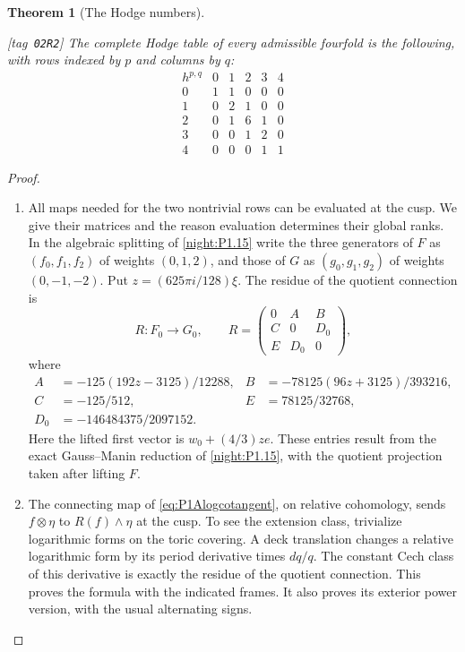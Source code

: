 \documentclass[11pt,a4paper]{article}
\numberwithin{equation}{section}
\newtheorem{theorem}{Theorem}[section]
\theoremstyle{definition}
\newcommand{\C}{\mathbb C}\newcommand{\R}{\mathbb R}\newcommand{\Z}{\mathbb Z}\newcommand{\Q}{\mathbb Q}\newcommand{\N}{\mathbb N}\newcommand{\F}{\mathbb F}
\newcommand{\StatementRecord}[4]{{\upshape\footnotesize[tag~\texttt{#3}]}\enspace\ignorespaces}
\begin{document}
\begin{theorem}[The Hodge numbers]\hypertarget{tag-02R2}{}\label{night:P1A.2}
\StatementRecord{night:P1A.2}{proved}{02R2}{\cref{night:P1.15,night:P1A.1,night:P1.18}}
The complete Hodge table of every admissible fourfold is the
following, with rows indexed by $p$ and columns by $q$:
\[
\begin{array}{c|ccccc}
h^{p,q}&0&1&2&3&4\\\hline
0&1&1&0&0&0\\
1&0&2&1&0&0\\
2&0&1&6&1&0\\
3&0&0&1&2&0\\
4&0&0&0&1&1
\end{array}
\]
\end{theorem}
\begin{proof}
\begin{enumerate}[label=\arabic*.]
\item All maps needed for the two nontrivial rows can be evaluated at
the cusp. We give their matrices and the reason evaluation
determines their global ranks. In the algebraic splitting of
\cref{night:P1.15} write the three generators of $F$ as $(f_0,f_1,f_2)$ of
weights $(0,1,2)$, and those of $G$ as $(g_0,g_1,g_2)$ of
weights $(0,-1,-2)$. Put $z=(625\pi i/128)\xi$.
The residue of the quotient connection is
\[
R:F_0\longrightarrow G_0,\qquad
R=\begin{pmatrix}0&A&B\\C&0&D_0\\E&D_0&0\end{pmatrix},
\]
where
\begin{align*}
A&=-125(192z-3125)/12288,&
B&=-78125(96z+3125)/393216,\\
C&=-125/512,&E&=78125/32768,\\
D_0&=-146484375/2097152.
\end{align*}
Here the lifted first vector is $w_0+(4/3)ze$.
These entries result from the exact Gauss--Manin reduction of
\cref{night:P1.15}, with the quotient projection taken after lifting $F$.

\item The connecting map of \eqref{eq:P1Alogcotangent}, on relative
cohomology, sends $f\otimes\eta$ to $R(f)\wedge\eta$ at the
cusp. To see the extension class, trivialize logarithmic
forms on the toric covering. A deck translation changes a
relative logarithmic form by its period derivative times
$dq/q$. The constant Cech class of this derivative is exactly
the residue of the quotient connection. This proves the
formula with the indicated frames. It also proves its exterior
power version, with the usual alternating signs.


\end{enumerate}
\end{proof}
\end{document}
